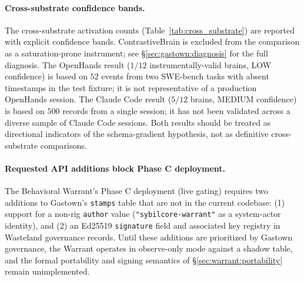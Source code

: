 \paragraph{Cross-substrate confidence bands.}
The cross-substrate activation counts (Table~\ref{tab:cross_substrate}) are
reported with explicit confidence bands. ContrastiveBrain is excluded from
the comparison as a saturation-prone instrument; see \S\ref{sec:gastown:diagnosis}
for the full diagnosis. The OpenHands result ($1/12$ instrumentally-valid
brains, LOW confidence) is based on $52$ events from two SWE-bench tasks
with absent timestamps in the test fixture; it is not representative of
a production OpenHands session. The Claude Code result ($5/12$ brains,
MEDIUM confidence) is based on $500$ records from a single session; it
has not been validated across a diverse sample of Claude Code sessions.
Both results should be treated as directional indicators of the
schema-gradient hypothesis, not as definitive cross-substrate comparisons.

\paragraph{Requested API additions block Phase C deployment.}
The Behavioral Warrant's Phase C deployment (live gating) requires two
additions to Gastown's \texttt{stamps} table that are not in the current
codebase: (1) support for a non-rig \texttt{author} value
(\texttt{"sybilcore-warrant"} as a system-actor identity), and (2) an
Ed25519 \texttt{signature} field and associated key registry in Wasteland
governance records. Until these additions are prioritized by Gastown
governance, the Warrant operates in observe-only mode against a shadow
table, and the formal portability and signing semantics of
\S\ref{sec:warrant:portability} remain unimplemented.